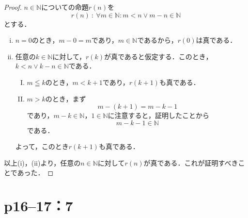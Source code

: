 \documentclass[a4paper,10pt,fleqn]{ltjsarticle}
\begin{document}
\newpage


\begin{tleftbar}
    \begin{proof}
        $n \in \mathbb{N}$についての命題$r(n)$を
        \[
            r(n) ~{:}~ \forall m \in \mathbb{N} \colon  m<n \lor m-n  \in \mathbb{N}
        \]
        とする．
        \begin{enumerate}[(i)]
            \item $n=0$のとき，$m - 0 =m$であり，$m \in \mathbb{N}$であるから，$r(0)$は真である．
            \item 任意の$k \in \mathbb{N}$に対して，$r(k)$が真であると仮定する．このとき，$k<n \lor k-n  \in \mathbb{N}$である．
                  \begin{enumerate}[(I)]
                      \item $m \leqq   k$のとき，$m <k+1$であり，$r(k+1)$も真である．
                      \item $m > k$のとき，まず
                            \[
                                m-(k+1)=m-k-1
                            \] であり，$m-k \in \mathbb{N}$，$1 \in \mathbb{N}$に注意すると，証明したことから
                            \[
                                m-k-1  \in \mathbb{N}
                            \]
                            である．
                  \end{enumerate}
                  よって，このとき$r(k+1)$も真である．
        \end{enumerate}
        以上(i)，(ii)より，任意の$n \in \mathbb{N}$に対して$r(n)$が真である．これが証明すべきことであった．
    \end{proof}
\end{tleftbar}

\newpage

\section*{p16--17：7}
\end{document}
